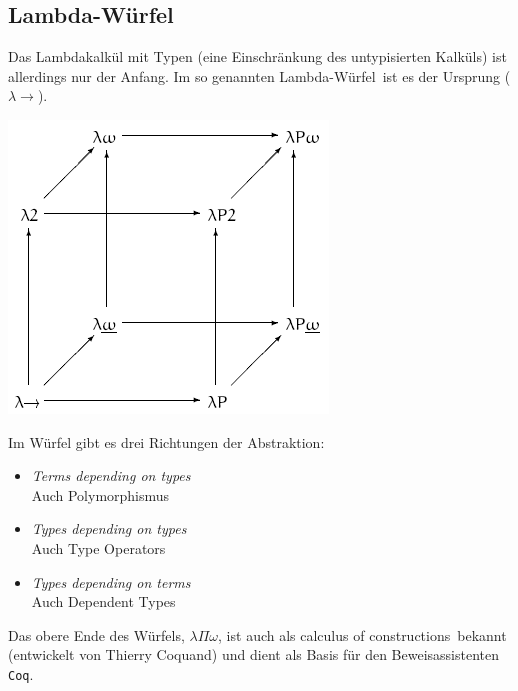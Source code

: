 \documentclass{beamer}
\begin{document}
\subsection*{Lambda-Würfel}

\begin{frame}

Das Lambdakalkül mit Typen (eine Einschränkung des untypisierten Kalküls) ist allerdings nur der Anfang. Im so genannten \glqq Lambda-Würfel\grqq\ ist es der Ursprung ($\lambda\to$).\pause

\begin{multicols}{2}
\begin{center}
\includegraphics[scale=0.4]{Lambda_cube.png} 
\end{center}
\columnbreak

Im Würfel gibt es drei Richtungen der Abstraktion:\smallskip\smallskip

\begin{itemize}
\pause\item \textit{Terms depending on types}
            \\ Auch \glqq Polymorphismus\grqq\
\pause\item \textit{Types depending on types}
            \\ Auch \glqq Type Operators\grqq\
\pause\item \textit{Types depending on terms}
            \\ Auch \glqq Dependent Types\grqq\
\end{itemize}

\end{multicols}
\pause

Das obere Ende des Würfels, $\lambda\Pi\omega$, ist auch als \glqq calculus of constructions\grqq\ bekannt (entwickelt von Thierry Coquand) und dient als Basis für den Beweisassistenten \texttt{Coq}.

\end{frame}
\end{document}
